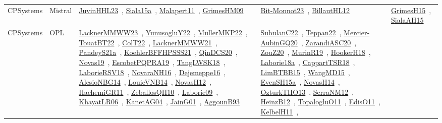 {\begin{longtable}{lp{3cm}>{\raggedright\arraybackslash}p{6cm}>{\raggedright\arraybackslash}p{6cm}>{\raggedright\arraybackslash}p{8cm}}
CPSystems & Mistral & \href{works/JuvinHHL23.pdf}{JuvinHHL23}~\cite{JuvinHHL23}, \href{works/Siala15a.pdf}{Siala15a}~\cite{Siala15a}, \href{works/Malapert11.pdf}{Malapert11}~\cite{Malapert11}, \href{works/GrimesHM09.pdf}{GrimesHM09}~\cite{GrimesHM09} & \href{works/Bit-Monnot23.pdf}{Bit-Monnot23}~\cite{Bit-Monnot23}, \href{works/BillautHL12.pdf}{BillautHL12}~\cite{BillautHL12} & \href{works/GrimesH15.pdf}{GrimesH15}~\cite{GrimesH15}, \href{works/SialaAH15.pdf}{SialaAH15}~\cite{SialaAH15}\\
CPSystems & OPL & \href{works/LacknerMMWW23.pdf}{LacknerMMWW23}~\cite{LacknerMMWW23}, \href{works/YunusogluY22.pdf}{YunusogluY22}~\cite{YunusogluY22}, \href{works/MullerMKP22.pdf}{MullerMKP22}~\cite{MullerMKP22}, \href{works/TouatBT22.pdf}{TouatBT22}~\cite{TouatBT22}, \href{works/ColT22.pdf}{ColT22}~\cite{ColT22}, \href{works/LacknerMMWW21.pdf}{LacknerMMWW21}~\cite{LacknerMMWW21}, \href{works/PandeyS21a.pdf}{PandeyS21a}~\cite{PandeyS21a}, \href{works/KoehlerBFFHPSSS21.pdf}{KoehlerBFFHPSSS21}~\cite{KoehlerBFFHPSSS21}, \href{works/QinDCS20.pdf}{QinDCS20}~\cite{QinDCS20}, \href{works/Novas19.pdf}{Novas19}~\cite{Novas19}, \href{works/EscobetPQPRA19.pdf}{EscobetPQPRA19}~\cite{EscobetPQPRA19}, \href{works/TangLWSK18.pdf}{TangLWSK18}~\cite{TangLWSK18}, \href{works/LaborieRSV18.pdf}{LaborieRSV18}~\cite{LaborieRSV18}, \href{works/NovaraNH16.pdf}{NovaraNH16}~\cite{NovaraNH16}, \href{works/Dejemeppe16.pdf}{Dejemeppe16}~\cite{Dejemeppe16}, \href{works/AlesioNBG14.pdf}{AlesioNBG14}~\cite{AlesioNBG14}, \href{works/LouieVNB14.pdf}{LouieVNB14}~\cite{LouieVNB14}, \href{works/NovasH12.pdf}{NovasH12}~\cite{NovasH12}, \href{works/HachemiGR11.pdf}{HachemiGR11}~\cite{HachemiGR11}, \href{works/ZeballosQH10.pdf}{ZeballosQH10}~\cite{ZeballosQH10}, \href{works/Laborie09.pdf}{Laborie09}~\cite{Laborie09}, \href{works/KhayatLR06.pdf}{KhayatLR06}~\cite{KhayatLR06}, \href{works/KanetAG04.pdf}{KanetAG04}~\cite{KanetAG04}, \href{works/JainG01.pdf}{JainG01}~\cite{JainG01}, \href{works/AggounB93.pdf}{AggounB93}~\cite{AggounB93} & \href{works/SubulanC22.pdf}{SubulanC22}~\cite{SubulanC22}, \href{works/Teppan22.pdf}{Teppan22}~\cite{Teppan22}, \href{works/Mercier-AubinGQ20.pdf}{Mercier-AubinGQ20}~\cite{Mercier-AubinGQ20}, \href{works/ZarandiASC20.pdf}{ZarandiASC20}~\cite{ZarandiASC20}, \href{works/ZouZ20.pdf}{ZouZ20}~\cite{ZouZ20}, \href{works/MurinR19.pdf}{MurinR19}~\cite{MurinR19}, \href{works/HookerH18.pdf}{HookerH18}~\cite{HookerH18}, \href{works/Laborie18a.pdf}{Laborie18a}~\cite{Laborie18a}, \href{works/CappartTSR18.pdf}{CappartTSR18}~\cite{CappartTSR18}, \href{works/LimBTBB15.pdf}{LimBTBB15}~\cite{LimBTBB15}, \href{works/WangMD15.pdf}{WangMD15}~\cite{WangMD15}, \href{works/EvenSH15a.pdf}{EvenSH15a}~\cite{EvenSH15a}, \href{works/NovasH14.pdf}{NovasH14}~\cite{NovasH14}, \href{works/OzturkTHO13.pdf}{OzturkTHO13}~\cite{OzturkTHO13}, \href{works/SerraNM12.pdf}{SerraNM12}~\cite{SerraNM12}, \href{works/HeinzB12.pdf}{HeinzB12}~\cite{HeinzB12}, \href{works/TopalogluO11.pdf}{TopalogluO11}~\cite{TopalogluO11}, \href{works/EdisO11.pdf}{EdisO11}~\cite{EdisO11}, \href{works/KelbelH11.pdf}{KelbelH11}~\cite{KelbelH11}, 
\end{longtable}}
